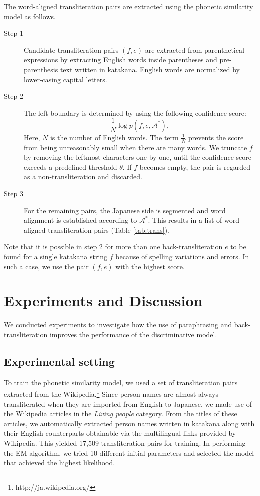 \documentclass[english]{jnlp_1.4_rep}
\begin{document}
The word-aligned transliteration pairs are extracted using the phonetic
similarity model as follows.
\begin{description}
 \item[Step 1]
	    Candidate transliteration pairs $(f,e)$ are extracted from
	    parenthetical expressions by extracting English words inside
	    parentheses and pre-parenthesis text written in
	    katakana. English words are normalized by lower-casing
	    capital letters.
 \item[Step 2]
	    The left boundary is determined by using the following
	    confidence score:
	    \[
	    \frac{1}{N}\log p(f,e,\mathcal{A}^{*}),
	    \]
	    Here, $N$ is the number of English words. The term
	    $\frac{1}{N}$ prevents the score from being unreasonably
	    small when there are many words. We truncate $f$ by removing
	    the leftmost characters one by one, until the confidence
	    score exceeds a predefined threshold $\theta$. If $f$
	    becomes empty, the pair is regarded as a non-transliteration
	    and discarded.
 \item[Step 3]
	    For the remaining pairs, the Japanese side is segmented and
	    word alignment is established according to
	    $\mathcal{A}^{*}$. This results in a list of word-aligned
	    transliteration pairs (Table \ref{tab:trans}).
\end{description}

\noindent
Note that it is possible in step 2 for more than one
back-transliteration $e$ to be found for a single katakana string $f$
because of spelling variations and errors. In such a case, we use the
pair $(f,e)$ with the highest score.


\section{Experiments and Discussion}
\label{sec:exp}

We conducted experiments to investigate how the use of paraphrasing and
back-transliteration improves the performance of the discriminative
model.

\subsection{Experimental setting}
\label{sec:setting}

To train the phonetic similarity model, we used a set of transliteration
pairs extracted from the Wikipedia.\footnote{http://ja.wikipedia.org/} 
Since person names are almost always transliterated when they are
imported from English to Japanese, we made use of the Wikipedia
articles in the {\it Living people} category. From the titles of these
articles, we automatically extracted person names written in katakana
along with their English counterparts obtainable via the multilingual
links provided by Wikipedia. This yielded 17,509 transliteration
pairs for training. In performing the EM algorithm, we tried 10
different initial parameters and selected the model that achieved the
highest likelihood.
\end{document}

